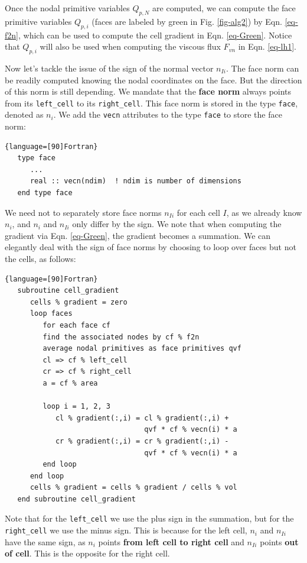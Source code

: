 \documentclass[12pt, letterpaper]{report}
\begin{document}
Once the nodal primitive variables $Q_{p,N}$ are computed, we can compute the face primitive
variables $Q_{p,i}$ (faces are labeled by green in Fig. \ref{fig-alg2}) by Eqn. \ref{eq-f2n}, which
can be used to compute the cell gradient in Eqn. \ref{eq-Green}. Notice that $Q_{p,i}$ will also be
used when computing the viscous flux $F_{vn}$ in Eqn. \ref{eq-lh1}. \paraspace

Now let's tackle the issue of the sign of the normal vector $n_{Ii}$. The face norm can be readily
computed knowing the nodal coordinates on the face. But the direction of this norm is still
depending. We mandate that the {\bf face norm} always points from its \verb+left_cell+ to its
\verb+right_cell+. This face norm is stored in the type \verb+face+, denoted as $n_i$. We add the
\verb+vecn+ attributes to the type \verb+face+ to store the face norm:

\begin{lstlisting}{language=[90]Fortran}
   type face
      ...
      real :: vecn(ndim)  ! ndim is number of dimensions
   end type face
\end{lstlisting}

We need not to separately store face norms $n_{Ii}$ for each cell $I$, as we already know $n_i$, and
$n_i$ and $n_{Ii}$ only differ by the sign. We note that when computing the gradient via Eqn.
\ref{eq-Green}, the gradient becomes a summation. We can elegantly deal with the sign of face norms
by choosing to loop over faces but not the cells, as follows:

\begin{lstlisting}{language=[90]Fortran}
   subroutine cell_gradient
      cells % gradient = zero
      loop faces
         for each face cf
         find the associated nodes by cf % f2n
         average nodal primitives as face primitives qvf
         cl => cf % left_cell
         cr => cf % right_cell
         a = cf % area
         
         loop i = 1, 2, 3
            cl % gradient(:,i) = cl % gradient(:,i) + 
                                 qvf * cf % vecn(i) * a
            cr % gradient(:,i) = cr % gradient(:,i) - 
                                 qvf * cf % vecn(i) * a
         end loop
      end loop
      cells % gradient = cells % gradient / cells % vol
   end subroutine cell_gradient
\end{lstlisting}

Note that for the \verb+left_cell+ we use the plus sign in the summation, but for the
\verb+right_cell+ we use the minus sign. This is because for the left cell, $n_i$ and $n_{Ii}$ have
the same sign, as $n_i$ points {\bf from left cell to right cell} and $n_{Ii}$ points {\bf out of
cell}. This is the opposite for the right cell. \paraspace
\end{document}
